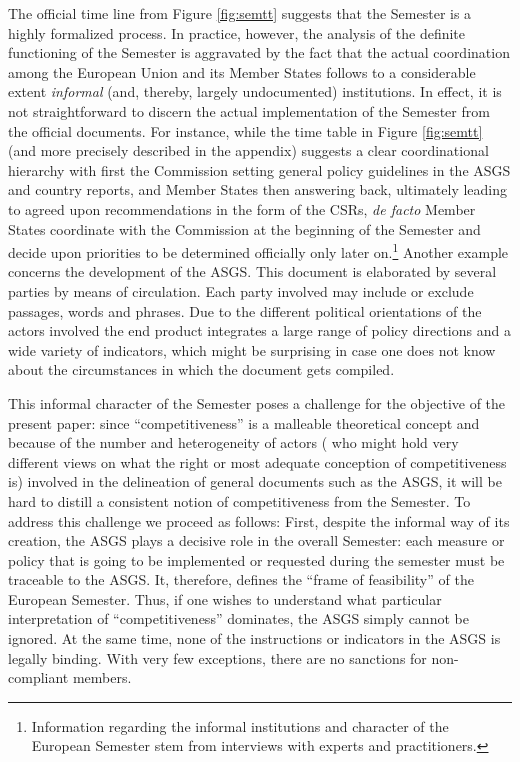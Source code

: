 \documentclass[
]{article}
\begin{document}
The official time line from Figure \ref{fig:semtt} suggests that the
Semester is a highly formalized process.
In practice, however, the analysis of the definite functioning of the Semester
is aggravated by the fact that the actual coordination
among the European Union and its Member States follows to a considerable
extent \emph{informal} (and, thereby, largely undocumented) institutions.
In effect, it is not straightforward to discern the actual implementation of
the Semester from the official documents.
For instance, while the time table in Figure \ref{fig:semtt}
(and more precisely described in the appendix) suggests a clear
coordinational hierarchy with first the Commission setting general policy
guidelines in the ASGS and country reports, and Member States then answering
back, ultimately leading to agreed upon recommendations in the form
of the CSRs, \emph{de facto} Member States coordinate with the
Commission at the beginning of the Semester and decide upon priorities to be
determined officially only later on.\footnote{Information regarding the
  informal institutions and character of the European Semester stem from
  interviews with experts and practitioners.}
Another example concerns the development of the ASGS.
This document is elaborated by several parties by
means of circulation. Each party involved may include or exclude
passages, words and phrases.
Due to the different political orientations of the actors involved
the end product integrates a large range of policy directions and a wide
variety of indicators, which might be surprising in case one does not
know about the circumstances in which the document gets compiled.

This informal character of the Semester poses a challenge for the
objective of the present paper:
since \enquote{competitiveness} is a malleable theoretical concept
and because of the number and heterogeneity of actors (
who might hold very different views on what the right or most adequate
conception of competitiveness is) involved in the delineation
of general documents such as the ASGS, it will be hard to distill a
consistent notion of competitiveness from the Semester.
To address this challenge we proceed as follows:
First, despite the informal way of its creation, the ASGS plays a decisive role
in the overall Semester: each measure or policy
that is going to be implemented or requested during the semester must be
traceable to the ASGS.
It, therefore, defines the \enquote{frame of feasibility} of the European Semester.
Thus, if one wishes to understand what particular interpretation of
\enquote{competitiveness} dominates, the ASGS simply cannot be ignored.
At the same time, none of the instructions or indicators in the ASGS is
legally binding. With very few exceptions, there are no sanctions for
non-compliant members.
\end{document}
